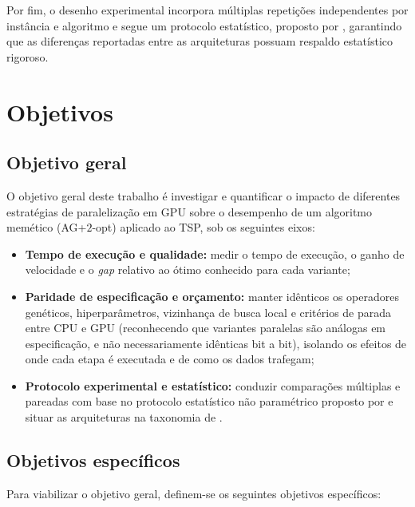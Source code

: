 Por fim, o desenho experimental incorpora múltiplas repetições independentes por instância e algoritmo e segue um protocolo estatístico, proposto por \textcite{demsar2006statistical}, garantindo que as diferenças reportadas entre as arquiteturas possuam respaldo estatístico rigoroso.

\section{Objetivos}\label{sec-13-objetivo-geral}

\subsection{Objetivo geral}\label{sec-131-objetivo-geral}

O objetivo geral deste trabalho é investigar e quantificar o impacto de diferentes estratégias de paralelização em GPU sobre o desempenho de um algoritmo memético (AG+\(2\)-opt) aplicado ao TSP, sob os seguintes eixos:

\begin{itemize}
      \item
            \textbf{Tempo de execução e qualidade:} medir o tempo de execução, o ganho de velocidade e o \emph{gap} relativo ao ótimo conhecido para cada variante;
      \item
            \textbf{Paridade de especificação e orçamento:} manter idênticos os operadores genéticos, hiperparâmetros, vizinhança de busca local e critérios de parada entre CPU e GPU (reconhecendo que variantes paralelas são análogas em especificação, e não necessariamente idênticas bit a bit), isolando os efeitos de onde cada etapa é executada e de como os dados trafegam;
      \item
            \textbf{Protocolo experimental e estatístico:} conduzir comparações múltiplas e pareadas com base no protocolo estatístico não paramétrico proposto por \textcite{demsar2006statistical} e situar as arquiteturas na taxonomia de \textcite{crainic2003parallel,crainic2010parallel}.
\end{itemize}

\subsection{Objetivos específicos}\label{sec-14-objetivos-especificos}

Para viabilizar o objetivo geral, definem-se os seguintes objetivos específicos:

